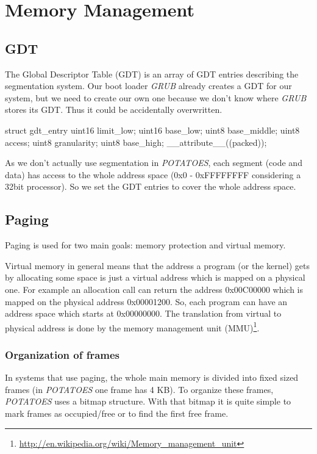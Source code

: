 \documentclass[11pt,a4paper]{scrartcl}
\begin{document}
\section{Memory Management}

\subsection{GDT}
The Global Descriptor Table (GDT) is an array of GDT entries describing the segmentation system.
Our boot loader \textit{GRUB} already creates a GDT for our system, but we need to create our own one because we don't know where \textit{GRUB} stores its GDT. Thus it could be accidentally overwritten.\\

\begin{code}[kernel/mm/mm.h]
struct gdt_entry {
	uint16 limit_low;
	uint16 base_low;
	uint8  base_middle;
	uint8  access;
	uint8  granularity;
	uint8  base_high;
} __attribute__((packed));
\end{code}
As we don't actually use segmentation in \textit{POTATOES}, each segment (code and data) has access to the whole address space (0x0 - 0xFFFFFFFF considering a 32bit processor). So we set the GDT entries to cover the whole address space.

\subsection{Paging}
Paging is used for two main goals: memory protection and virtual memory.

Virtual memory in general means that the address a program (or the kernel) gets by allocating some space is just a virtual address which is mapped on a physical one. For example an allocation call can return the address 0x00C00000 which is mapped on the physical address 0x00001200. So, each program can have an address space which starts at 0x00000000. The translation from virtual to physical address is done by the memory management unit (MMU)\footnote{\url{http://en.wikipedia.org/wiki/Memory_management_unit}}.
\subsubsection{Organization of frames}
In systems that use paging, the whole main memory is divided into fixed sized frames (in \textit{POTATOES} one frame has 4 KB).
To organize these frames, \textit{POTATOES} uses a bitmap structure. With that bitmap it is quite simple to mark frames as occupied/free or to find the first free frame.
\end{document}

